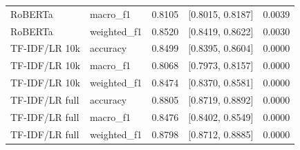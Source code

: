 \documentclass[10pt,a4paper]{article}
\begin{document}
{\begin{longtable}{@{}llrrr@{}}
RoBERTa & macro\_f1 & 0.8105 & [0.8015, 0.8187] & 0.0039 \\
RoBERTa & weighted\_f1 & 0.8520 & [0.8419, 0.8622] & 0.0030 \\
TF-IDF/LR 10k & accuracy & 0.8499 & [0.8395, 0.8604] & 0.0000 \\
TF-IDF/LR 10k & macro\_f1 & 0.8068 & [0.7973, 0.8157] & 0.0000 \\
TF-IDF/LR 10k & weighted\_f1 & 0.8474 & [0.8370, 0.8581] & 0.0000 \\
TF-IDF/LR full & accuracy & 0.8805 & [0.8719, 0.8892] & 0.0000 \\
TF-IDF/LR full & macro\_f1 & 0.8476 & [0.8402, 0.8549] & 0.0000 \\
TF-IDF/LR full & weighted\_f1 & 0.8798 & [0.8712, 0.8885] & 0.0000 \\
\end{longtable}
}
\end{document}
